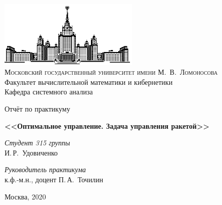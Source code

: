 \documentclass{subfiles}
\begin{document}
\thispagestyle{empty}

\begin{center}
\ \vspace{-3cm}

\includegraphics[width=0.5\textwidth]{msu.eps}\\
{\scshape Московский государственный университет имени М.~В.~Ломоносова}\\
Факультет вычислительной математики и кибернетики\\
Кафедра системного анализа

\vfill

{\LARGE Отчёт по практикуму}

\vspace{1cm}

{\Huge\bfseries <<Оптимальное управление. Задача управления ракетой>>}
\end{center}

\vspace{1cm}

\begin{flushright}
  \large
  \textit{Студент 315 группы}\\
  И.\,Р.~Удовиченко

  \vspace{5mm}

  \textit{Руководитель практикума}\\
  к.ф.-м.н., доцент П.\,А.~Точилин
\end{flushright}

\vfill

\begin{center}
Москва, 2020
\end{center}

\newpage
\end{document}
